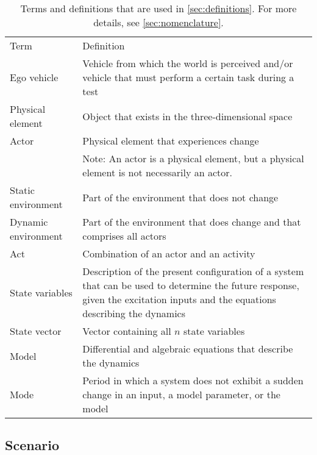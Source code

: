 \begin{table}[t]
	\cstartc\caption{Terms and definitions that are used in \cref{sec:definitions}. For more details, see \cref{sec:nomenclature}.}
	\label{tab:nomenclature}
	\begin{tabularx}{\linewidth}{lX}
		\toprule
		Term & Definition \\ \otoprule
		Ego vehicle & Vehicle from which the world is perceived and/or vehicle that must perform a certain task during a test \\
		Physical element & Object that exists in the three-dimensional space \\
		Actor & Physical element that experiences change \\
		& Note: An actor is a physical element, but a physical element is not necessarily an actor. \\
		Static environment & Part of the environment that does not change \\
		Dynamic environment & Part of the environment that does change and that comprises all actors \\
		Act & Combination of an \cendc\cstarte actor \cende\cstartc and an activity \\
		State variables & Description of the present configuration of a system that can be used to determine the future response, given the excitation inputs and the equations describing the dynamics \\	
		State vector & Vector containing all $n$ state variables \\
		Model & Differential \cendc\cstartd and algebraic \cendd\cstartc equations that describe the dynamics \\
		Mode & Period in which a system does not exhibit a sudden change \cendc\cstartd in an input, a model parameter, or the model \cendd\cstartc \\	
		\bottomrule
	\end{tabularx}\cendc
\end{table}



\subsection{Scenario}
\label{sec:scenario}

